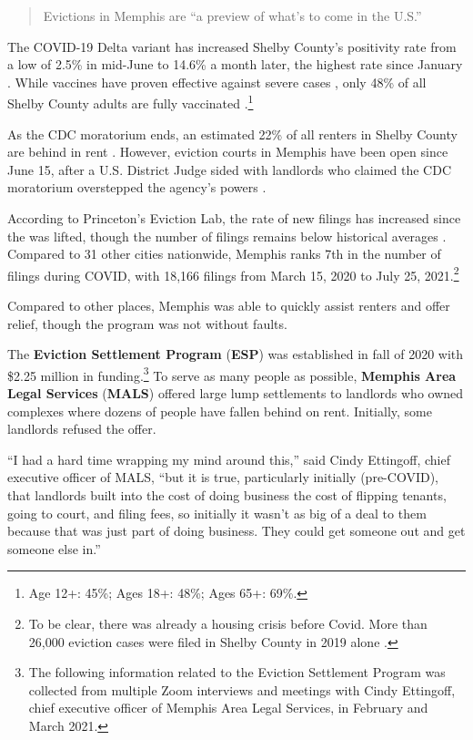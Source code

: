 \documentclass[
]{book}
\begin{document}
\begin{quote}
Evictions in Memphis are ``a preview of what's to come in the U.S.''

\citep{gowen2021}
\end{quote}

The COVID-19 Delta variant has increased Shelby County's positivity rate from a low of 2.5\% in mid-June to 14.6\% a month later, the highest rate since January \citep{shelbycountyhealthdepartment}. While vaccines have proven effective against severe cases \citep{mandavilli2021}, only 48\% of all Shelby County adults are fully vaccinated \citep{thenewyorktimes2020}.\footnote{Age 12+: 45\%; Ages 18+: 48\%; Ages 65+: 69\%.}

As the CDC moratorium ends, an estimated 22\% of all renters in Shelby County are behind in rent \citep{sgaier2021}. However, eviction courts in Memphis have been open since June 15, after a U.S. District Judge sided with landlords who claimed the CDC moratorium overstepped the agency's powers \citep{bailey2021, bailey2021a}.

According to Princeton's Eviction Lab, the rate of new filings has increased since the was lifted, though the number of filings remains below historical averages \citep{evictionlab2021}. Compared to 31 other cities nationwide, Memphis ranks 7th in the number of filings during COVID, with 18,166 filings from March 15, 2020 to July 25, 2021.\footnote{To be clear, there was already a housing crisis before Covid. More than 26,000 eviction cases were filed in Shelby County in 2019 alone \citep[ 2]{ahmed2021}.}

Compared to other places, Memphis was able to quickly assist renters and offer relief, though the program was not without faults.

The \textbf{Eviction Settlement Program} (\textbf{ESP}) was established in fall of 2020 with \$2.25 million in funding.\footnote{The following information related to the Eviction Settlement Program was collected from multiple Zoom interviews and meetings with Cindy Ettingoff, chief executive officer of Memphis Area Legal Services, in February and March 2021.} To serve as many people as possible, \textbf{Memphis Area Legal Services} (\textbf{MALS}) offered large lump settlements to landlords who owned complexes where dozens of people have fallen behind on rent. Initially, some landlords refused the offer.

``I had a hard time wrapping my mind around this,'' said Cindy Ettingoff, chief executive officer of MALS, ``but it is true, particularly initially (pre-COVID), that landlords built into the cost of doing business the cost of flipping tenants, going to court, and filing fees, so initially it wasn't as big of a deal to them because that was just part of doing business. They could get someone out and get someone else in.''
\end{document}

